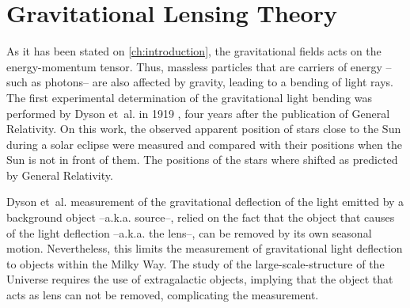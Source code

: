 \chapter{Gravitational Lensing Theory}
\label{ch:theory}
As it has been stated on \autoref{ch:introduction}, the gravitational fields acts on the energy-momentum tensor. Thus, massless particles that are carriers of energy --such as photons-- are also affected by gravity, leading to a bending of light rays. The first experimental determination of the gravitational light bending was performed by Dyson et~al. in 1919 \cite{Dyson291}, four years after the publication of General Relativity. On this work, the observed apparent position of stars close to the Sun during a solar eclipse were measured and compared with their positions when the Sun is not in front of them. The positions of the stars where shifted as predicted by General Relativity.
\newline

Dyson et~al. measurement of the gravitational deflection of the light emitted by a background object --a.k.a. source--, relied on the fact that the object that causes of the light deflection --a.k.a. the lens--, can be removed by its own seasonal motion. Nevertheless, this limits the measurement of gravitational light deflection to objects within the Milky Way. The study of the large-scale-structure of the Universe requires the use of extragalactic objects, implying that the object that acts as lens can not be removed, complicating the measurement.
\newline

